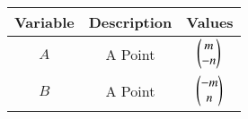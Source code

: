 \begin{center}
    \begin{tabular}{|c|c|c|} 
        \hline
            \textbf{Variable} & \textbf{Description} & \textbf{Values} \\ 
        \hline
            $A$ & A Point & $\begin{pmatrix}m \\
            -n\end{pmatrix}$\\ 
        \hline
            $B$ & A Point & $\begin{pmatrix}-m \\
            n\end{pmatrix}$\\ 
        \hline
    \end{tabular}
\end{center}  

